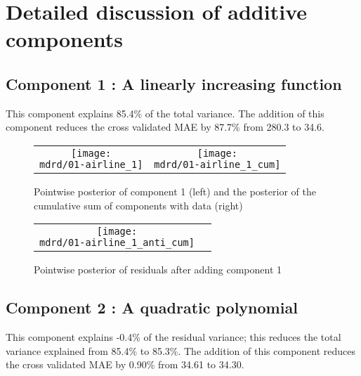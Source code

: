\documentclass{article} %
\begin{document}
\section{Detailed discussion of additive components}
\label{sec:discussion}

\subsection{Component 1 : A linearly increasing function}



This component explains 85.4\% of the total variance.
The addition of this component reduces the cross validated MAE by 87.7\% from 280.3 to 34.6.


\begin{figure}[H]
\newcommand{\wmgd}{0.5\columnwidth}
\newcommand{\hmgd}{3.0cm}
\newcommand{\mdrd}{01-airline}
\newcommand{\mbm}{\hspace{-0.3cm}}
\begin{tabular}{cc}
\mbm \texttt{[image: \\mdrd/01-airline\_1]} & \texttt{[image: \\mdrd/01-airline\_1\_cum]}
\end{tabular}
\caption{Pointwise posterior of component 1 (left) and the posterior of the cumulative sum of components with data (right)}
\label{fig:comp1}
\end{figure}

\begin{figure}[H]
\newcommand{\wmgd}{0.5\columnwidth}
\newcommand{\hmgd}{3.0cm}
\newcommand{\mdrd}{01-airline}
\newcommand{\mbm}{\hspace{-0.3cm}}
\begin{tabular}{cc}
\mbm \texttt{[image: \\mdrd/01-airline\_1\_anti\_cum]}
\end{tabular}
\caption{Pointwise posterior of residuals after adding component 1}
\label{fig:comp1}
\end{figure}

\subsection{Component 2 : A quadratic polynomial}



This component explains -0.4\% of the residual variance; this reduces the total variance explained from 85.4\% to 85.3\%.
The addition of this component reduces the cross validated MAE by 0.90\% from 34.61 to 34.30.
\end{document}
